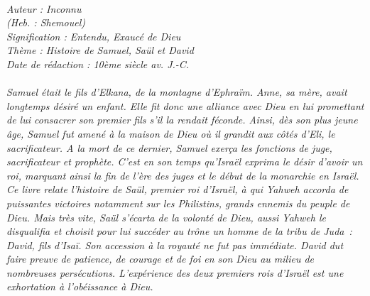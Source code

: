 \BFont
\noindent\hrulefill
{\footnotesize
\textit{
\bigskip
{\centering{}
\\Auteur : Inconnu
\\(Heb. : Shemouel)
\\Signification : Entendu, Exaucé de Dieu
\\Thème : Histoire de Samuel, Saül et David
\\Date de rédaction : 10ème siècle av. J.-C.\\}
}
\textit{
\\Samuel était le fils d’Elkana, de la montagne d’Ephraïm. Anne, sa mère, avait longtemps désiré un enfant. Elle  fit donc une alliance avec Dieu en lui  promettant de lui consacrer son premier fils s’il la rendait féconde. Ainsi, dès son plus jeune âge, Samuel fut amené à la maison de Dieu où il grandit aux côtés d’Eli, le sacrificateur. A la mort de ce dernier, Samuel exerça les fonctions de juge, sacrificateur et prophète. C’est en son temps qu’Israël exprima le désir d’avoir un roi, marquant ainsi la fin de l’ère des juges et le début de la monarchie en Israël.
\\Ce livre relate l’histoire de Saül, premier roi d’Israël, à qui Yahweh accorda de puissantes victoires notamment sur les Philistins, grands ennemis du peuple de Dieu.  Mais très vite, Saül s’écarta de la volonté de Dieu, aussi Yahweh le disqualifia et choisit pour lui succéder au trône un homme de la tribu de Juda : David, fils d’Isaï. Son accession à la royauté ne fut pas immédiate. David dut faire preuve de patience, de courage et de foi en son Dieu au milieu de nombreuses persécutions. L’expérience des deux premiers rois d’Israël est une exhortation à l’obéissance à Dieu.\bigskip
}
}
\par\nobreak\noindent\hrulefill
